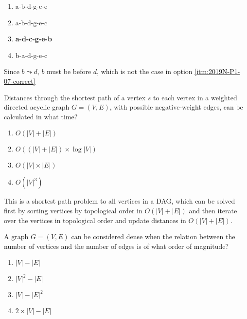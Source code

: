 \documentclass{cal}
\begin{document}
{\begin{center}
\end{center}
\begin{enumerate}[label=\Alph*)]\itemsep0em
    \item a-b-d-g-c-e
    \item a-b-d-g-e-c 
    \item \label{itm:2019N-P1-07-correct} \textbf{a-d-c-g-e-b \greencheckmark}
    \item b-a-d-g-e-c
\end{enumerate}

\ansseparator

Since $b \leadsto d$, $b$ must be before $d$, which is not the case in option \ref{itm:2019N-P1-07-correct}

Distances through the shortest path of a vertex $s$ to each vertex in a weighted directed acyclic graph $G=(V,E)$, with possible negative-weight edges, can be calculated in what time?
\begin{enumerate}[label=\Alph*)]\itemsep0em
    \item $O(|V|+|E|)$ \greencheckmark
    \item $O((|V|+|E|) \times \log |V|)$
    \item $O(|V|\times|E|)$
    \item $O(|V|^3)$
\end{enumerate}

\ansseparator

This is a shortest path problem to all vertices in a DAG, which can be solved first by sorting vertices by topological order in $O(|V|+|E|)$ and then iterate over the vertices in topological order and update distances in $O(|V|+|E|)$.

A graph $G=(V,E)$ can be considered dense when the relation between the number of vertices and the number of edges is of what order of magnitude?
\begin{enumerate}[label=\Alph*)]\itemsep0em
    \item $|V|-|E|$
    \item $|V|^2-|E|$ \greencheckmark
    \item $|V|-|E|^2$
    \item $2 \times |V| - |E|$
\end{enumerate}

}
\end{document}
